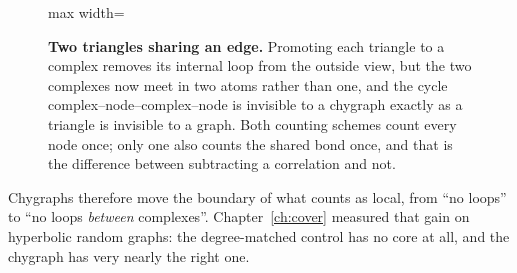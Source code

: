 \begin{figure}[t]
\centering
\begin{adjustbox}{max width=\linewidth}
\end{adjustbox}
\caption{\textbf{Two triangles sharing an edge.} Promoting
each triangle to a complex removes its internal loop from the outside view, but
the two complexes now meet in two atoms rather than one, and the cycle
complex--node--complex--node is invisible to a chygraph exactly as a triangle is
invisible to a graph. Both counting schemes count every node once; only one also
counts the shared bond once, and that is the difference between subtracting a
correlation and not.}
\label{fig:sharededge}
\end{figure}

Chygraphs therefore move the boundary of what counts as local, from ``no
loops'' to ``no loops \emph{between} complexes''. Chapter~\ref{ch:cover}
measured that gain on hyperbolic random graphs: the degree-matched control has
no core at all, and the chygraph has very nearly the right one.

